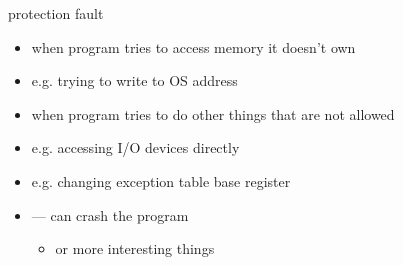 \begin{frame}{protection fault}
\begin{itemize}
\item when program tries to access memory it doesn't own
\item e.g. trying to write to OS address
\vspace{.5cm}
\item when program tries to do other things that are not allowed
\item e.g. accessing I/O devices directly
\item e.g. changing exception table base register
\vspace{.5cm}
\item {} --- can crash the program
\begin{itemize}
\item or more interesting things
\end{itemize}
\end{itemize}
\end{frame}

